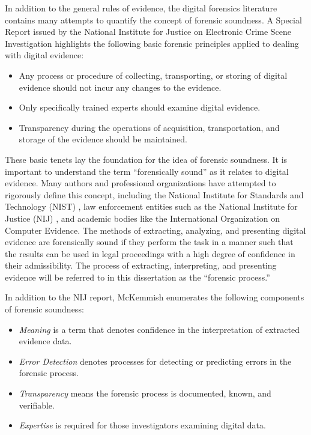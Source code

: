 In addition to the general rules of evidence, the digital forensics literature contains many attempts to quantify the concept of forensic soundness.
A Special Report issued by the National Institute for Justice on Electronic Crime Scene Investigation \cite{NIJ2008} highlights the following basic forensic 
principles applied to dealing with digital evidence:

\begin{itemize}
\item Any process or procedure of collecting, transporting, or storing of digital evidence should not incur any changes to the evidence.
\item Only specifically trained experts should examine digital evidence.
\item Transparency during the operations of acquisition, transportation, and storage of the evidence should be maintained.
\end{itemize}

These basic tenets lay the foundation for the idea of forensic soundness. It is important to understand the term “forensically sound” 
as it relates to digital evidence. Many authors and professional organizations have attempted to rigorously define this concept, 
including the National Institute for Standards and Technology (NIST) \cite{NIST2001}, law enforcement entities such as the National Institute for 
Justice (NIJ) \cite{NIJ2008}, and academic bodies like the International Organization on Computer Evidence\cite{IOCE2002}. The methods of extracting, analyzing, 
and presenting digital evidence are forensically sound if they perform the task in a manner such that the results can be used in legal 
proceedings with a high degree of confidence in their admissibility. The process of extracting, interpreting, and presenting evidence 
will be referred to in this dissertation as the “forensic process.”

In addition to the NIJ report, McKemmish \cite{mckemmish2008} enumerates the following components of forensic soundness:

\begin{itemize}
\item \emph{Meaning} is a term that denotes confidence in the interpretation of extracted evidence data.
\item \emph{Error Detection} denotes processes for detecting or predicting errors in the forensic process.
\item \emph{Transparency} means the forensic process is documented, known, and verifiable.
\item \emph{Expertise} is required for those investigators examining digital data.
\end{itemize}

